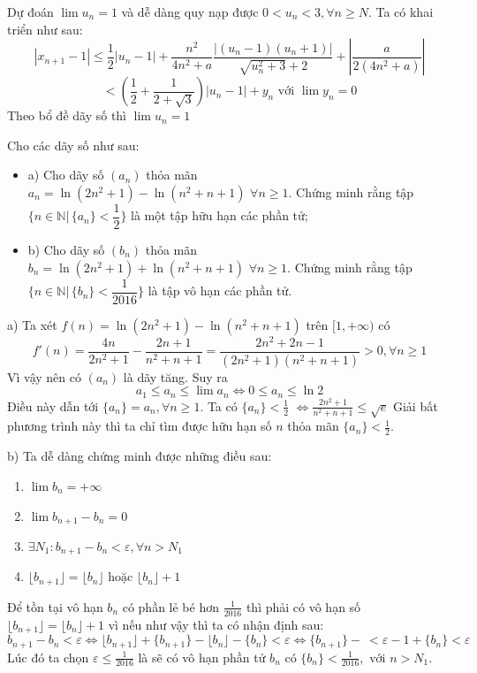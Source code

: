 \documentclass[11pt]{scrartcl}
\begin{document}
\begin{itemize}[label=, leftmargin=0em, itemsep=0.5em]
    \begin{sol}
        Dự đoán $\lim u_n = 1$ và dễ dàng quy nạp được $0 < u_n < 3, \forall n\geq N$. Ta có khai triển như sau:
        \[|x_{n+1} - 1| \leq \frac{1}{2}|u_n - 1| + \frac{n^2}{4n^2 + a}\frac{|(u_n - 1)(u_n + 1)|}{\sqrt{u_n^2 + 3} + 2} + |\frac{a}{2(4n^2 + a)}|\]\[ < \left(\frac{1}{2} + \frac{1}{2 + \sqrt{3}}\right)|u_n - 1| + y_n \text{ với } \lim y_n = 0\]
        Theo bổ đề dãy số thì $\lim u_n = 1$
    \end{sol}
    \begin{bt}Cho các dãy số như sau:
        \begin{itemize}[label=]
            \item a) Cho dãy số $(a_n)$ thỏa mãn  $a_n=\ln (2n^2+1)-\ln (n^2+n+1)\,\,\forall n\geq 1.$ Chứng minh rằng tập $\{n\in\mathbb{N}|\,\{a_n\}<\dfrac{1}{2}\}$ là một tập hữu hạn các phần tử;
            \item b) Cho dãy số $(b_n)$ thỏa mãn $b_n=\ln (2n^2+1)+\ln (n^2+n+1)\,\,\forall n\geq 1$. Chứng minh rằng tập $\{n\in\mathbb{N}|\,\{b_n\}<\dfrac{1}{2016}\}$ là tập vô hạn các phần tử.
        \end{itemize}
    \end{bt}

    \begin{sol}
        a) Ta xét  $f(n) = \ln(2n^2 + 1) - \ln(n^2 + n + 1)$ trên $[1,+\infty)$ có $$f'(n) = \frac{4n}{2n^2 + 1} - \frac{2n + 1}{n^2 + n + 1}  = \frac{2n^2 + 2n - 1}{(2n^2 + 1)(n^2 + n + 1)} > 0, \forall n \geq 1$$
        Vì vậy nên có $(a_n)$ là dãy tăng. Suy ra
        $$
        a_1 \leq a_n \leq \lim a_n \Leftrightarrow 0 \leq a_n \leq \ln 2 
        $$
        Điều này dẫn tới $\{a_n\} = a_n, \forall n \geq 1$. Ta có $\{a_n\} < \frac{1}{2}$
        $
        \Leftrightarrow \frac{2n^2 + 1}{n^2 + n + 1} \leq \sqrt{e}
        $
        Giải bất phương trình này thì ta chỉ tìm được hữu hạn số $n$ thỏa mãn $\{a_n\} < \frac{1}{2}$.


        b) Ta dễ dàng chứng minh được những điều sau:
        \begin{enumerate}
            \item $\lim b_n = +\infty$
            \item $\lim b_{n + 1} - b_n = 0$
            \item $\exists N_1: b_{n + 1} - b_{n} < \varepsilon, \forall n > N_1$
            \item $\lfloor b_{n + 1} \rfloor = \lfloor b_n \rfloor \text{ hoặc } \lfloor b_n \rfloor + 1$
        \end{enumerate}
        Để tồn tại vô hạn $b_n$ có phần lẻ bé hơn $\frac{1}{2016}$ thì phải có vô hạn số $\lfloor b_{n + 1} \rfloor =  \lfloor b_n \rfloor + 1$ vì nếu như vậy thì ta có nhận định sau: 
        \[ b_{n + 1} - b_{n} < \varepsilon \Leftrightarrow \lfloor b_{n + 1} \rfloor + \{b_{n + 1}\} - \lfloor b_n \rfloor- \{b_{n}\}  < \varepsilon \Leftrightarrow \{b_{n+1}\} - \ < \varepsilon - 1 + \{b_n\} < \varepsilon 
        \]
        Lúc đó ta chọn $\varepsilon \leq \frac{1}{2016}$ là sẽ có vô hạn phần tử $b_n$ có $\{b_n\} < \frac{1}{2016},  \text{ với } n > N_1$.


\end{sol}
\end{itemize}
\end{document}
